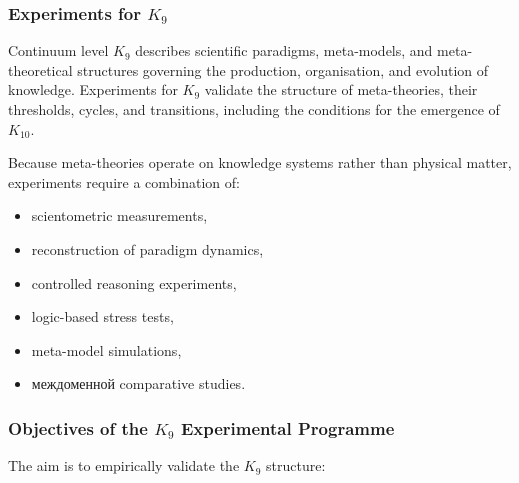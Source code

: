 
\subsubsection{Experiments for \texorpdfstring{$K_9$}{K_9}}
\label{sec:experiments-k9}

Continuum level $K_9$ describes scientific paradigms, 
meta-models, and meta-theoretical structures governing the 
production, organisation, and evolution of knowledge.  
Experiments for $K_9$ validate the structure of meta-theories,
their thresholds, cycles, and transitions, including the
conditions for the emergence of $K_{10}$.

Because meta-theories operate on knowledge systems rather than 
physical matter, experiments require a combination of:

\begin{itemize}
    \item scientometric measurements,
    \item reconstruction of paradigm dynamics,
    \item controlled reasoning experiments,
    \item logic-based stress tests,
    \item meta-model simulations,
    \item междоменной comparative studies.
\end{itemize}



\subsubsection{Objectives of the \texorpdfstring{$K_9$}{K_9} Experimental Programme}

The aim is to empirically validate the $K_9$ structure:

